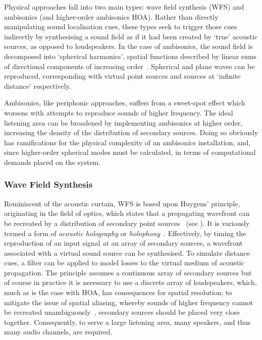 Physical approaches fall into two main types: wave field synthesis (WFS) and
ambisonics (and higher-order ambisonics \textemdash{} HOA). Rather than
directly manipulating sound localisation cues, these types seek to trigger
those cues indirectly by synthesising a sound field as if it had been created
by `true' acoustic sources, as opposed to loudspeakers.
In the case of ambisonics, the sound field is decomposed into `spherical
harmonics', spatial functions described by linear sums of directional
components of increasing order~\citep{nicol_sound_2017}.
Spherical and plane waves can be reproduced, corresponding with virtual
point sources and sources at `infinite distance' respectively.

Ambisonics, like periphonic approaches, suffers from a sweet-spot effect which
worsens with attempts to reproduce sounds of higher frequency.
The ideal listening area can be broadened by implementing ambisonics at higher
order, increasing the density of the distribution of secondary sources.
Doing so obviously has ramifications for the physical complexity of an
ambisonics installation, and, since higher-order spherical modes must be
calculated, in terms of computational demands placed on the system.

\subsubsection{Wave Field Synthesis}

Reminiscent of the acoustic curtain, WFS is based upon Huygens' principle,
originating in the field of optics, which states that a propagating
wavefront can be recreated by a distribution of secondary point
sources~\citep{mueller_acoustic_1971,berkhout_acoustic_1993,
    belloch_performance_2021} (see ).
It is variously termed a form of \textit{acoustic holography} or
\textit{holophony}~\citep{berkhout_holographic_1988,ahrens_analytic_2012}.
Effectively, by timing the reproduction of an input signal at an array of
secondary sources, a wavefront associated with a virtual sound source can be
synthesised.
To simulate distance cues, a filter can be applied to model losses to the
virtual medium of acoustic propagation.
The principle assumes a continuous array of secondary sources but of course in
practice it is necessary to use a discrete array of loudspeakers, which,
much as is the case with HOA, has consequences for spatial resolution;
to mitigate the issue of spatial aliasing, whereby sounds of higher frequency
cannot be recreated unambiguously~\citep{winter_geometric_2018},
secondary sources should be placed very close together.
Consequently, to serve a large listening area, many speakers, and thus many
audio channels, are required.

